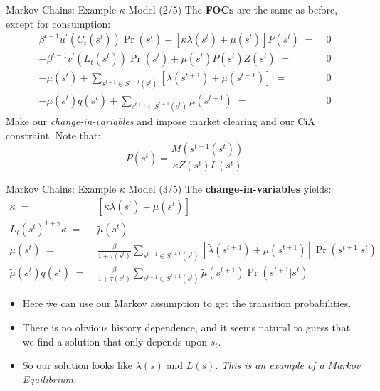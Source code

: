 \documentclass[10pt,c,aspectratio=1610,handout]{beamer}
\begin{document}
\begin{frame}{Markov Chains: Example $\kappa$ Model (2/5)}%
  The \textbf{FOCs} are the same as before, except for consumption:%
  \begin{align}%
    \beta^{t-1}u^{\prime }(C_t(s^{t}))\Pr (s^{t})-\left[\kappa \lambda (s^{t})+\mu(s^{t})\right] P(s^{t}) \; = & \; 0\\%
    -\beta^{t-1}v^{\prime}(L_t(s^{t}))\Pr(s^{t})+\mu(s^{t})P(s^{t})Z(s^{t}) \; = & \; 0\\%
    -\mu(s^{t})+\sum_{s^{t+1}\in S^{t+1}(s^{t})}\left[ \lambda (s^{t+1})+\mu(s^{t+1})\right] \; = & \; 0\\%
    -\mu (s^{t})q(s^{t})+\sum_{s^{t+1}\in S^{t+1}(s^{t})}\mu (s^{t+1}) \; = & \; 0%
  \end{align}%
  \pause%
  Make our \emph{change-in-variables} and impose market clearing and our CiA constraint. Note that: $$ P(s^{t}) = \frac{M(s^{t-1}(s^t))}{\kappa Z(s^t)L(s^t)} $$%
\end{frame}%
\begin{frame}{Markov Chains: Example $\kappa$ Model (3/5)}%
  The \textbf{change-in-variables} yields:%
  \begin{align}%
    \kappa \; = & \; \left[\kappa  \tilde{\lambda} (s^{t})+\tilde{\mu} (s^{t})\right]\\%
    L_t(s^{t})^{1+\gamma} \kappa \; = & \; \tilde{\mu} (s^{t})\\%
    \tilde{\mu} (s^{t}) \; = & \; \frac{\beta}{1+\tau(s^t)} \sum_{s^{t+1}\in S^{t+1}(s^{t})}\left[ \tilde{\lambda} (s^{t+1})+ \tilde{\mu} (s^{t+1})\right] \Pr (s^{t+1}|s^t)\\%
    \tilde{\mu} (s^{t})q(s^{t}) \; = & \; \frac{\beta}{1+\tau(s^t)} \sum_{s^{t+1}\in S^{t+1}(s^{t})} \tilde{\mu} (s^{t+1})\Pr (s^{t+1}|s^t)%
  \end{align}%
  \pause%
  \begin{itemize}%
    \item[$\blacktriangleright$] Here we can use our Markov assumption to get the transition probabilities.%
    \pause%
    \item[$\blacktriangleright$] There is no obvious history dependence, and it seems natural to guess that we find a solution that only depends upon $s_t$.%
    \pause%
    \item[$\blacktriangleright$] So our solution looks like $\tilde{\lambda}(s)$ and $L(s)$. \emph{This is an example of a Markov Equilibrium.}%
  \end{itemize}%
\end{frame}%
\end{document}
